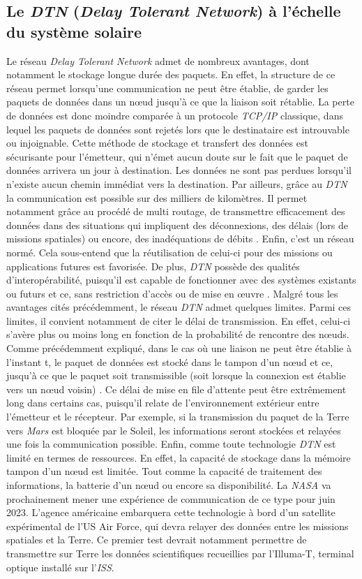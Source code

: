 \documentclass[conference]{IEEEtran}
\begin{document}
\subsection{Le \emph{DTN} (\emph{Delay Tolerant Network}) à l'échelle du système solaire}
\label{sec:DTNL}
Le réseau \emph{Delay Tolerant Network} admet de nombreux avantages, dont notamment le stockage longue durée des paquets. En effet, la structure de ce réseau permet lorsqu’une communication ne peut être établie, de garder les paquets de données dans un nœud jusqu’à ce que la liaison soit rétablie. La perte de données est donc moindre comparée à un protocole \emph{TCP/IP} classique, dans lequel les paquets de données sont rejetés lors que le destinataire est introuvable ou injoignable.
Cette méthode de stockage et transfert des données est sécurisante pour l’émetteur, qui n’émet aucun doute sur le fait que le paquet de données arrivera un jour à destination. Les données ne sont pas perdues lorsqu’il n’existe aucun chemin immédiat vers la destination.
Par ailleurs, grâce au \emph{DTN} la communication est possible sur des milliers de kilomètres. Il permet notamment grâce au procédé de multi routage, de transmettre efficacement des données dans des situations qui impliquent des déconnexions, des délais (lors de missions spatiales) ou encore, des inadéquations de débits \cite{b13}. 
Enfin, c’est un réseau normé. Cela sous-entend que la réutilisation de celui-ci pour des missions ou applications futures est favorisée. De plus, \emph{DTN} possède des qualités d’interopérabilité, puisqu’il est capable de fonctionner avec des systèmes existants ou futurs et ce, sans restriction d’accès ou de mise en œuvre \cite{b14}\cite{b15}. 
Malgré tous les avantages cités précédemment, le réseau \emph{DTN} admet quelques limites. Parmi ces limites, il convient notamment de citer le délai de transmission. En effet, celui-ci s’avère plus ou moins long en fonction de la probabilité de rencontre des nœuds. Comme précédemment expliqué, dans le cas où une liaison ne peut être établie à l’instant t, le paquet de données est stocké dans le tampon d’un nœud et ce, jusqu’à ce que le paquet soit transmissible (soit lorsque la connexion est établie vers un nœud voisin) \cite{b16}.
Ce délai de mise en file d’attente peut être extrêmement long dans certains cas, puisqu’il relate de l’environnement extérieur entre l’émetteur et le récepteur. Par exemple, si la transmission du paquet de la Terre vers \emph{Mars} est bloquée par le Soleil, les informations seront stockées et relayées une fois la communication possible.
Enfin, comme toute technologie \emph{DTN} est limité en termes de ressources. En effet, la capacité de stockage dans la mémoire tampon d’un nœud est limitée. Tout comme la capacité de traitement des informations, la batterie d’un nœud ou encore sa disponibilité.
La \emph{NASA} va prochainement mener une expérience de communication de ce type pour juin 2023. L'agence américaine embarquera cette technologie à bord d'un satellite expérimental de l'US Air Force, qui devra relayer des données entre les missions spatiales et la Terre. Ce premier test devrait notamment permettre de transmettre sur Terre les données scientifiques recueillies par l'Illuma-T, terminal optique installé sur l'\emph{ISS}. 
\end{document}
